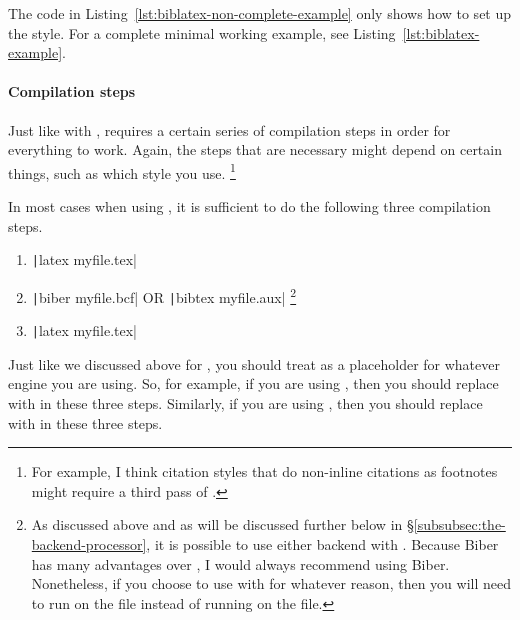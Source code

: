 The code in Listing~\ref{lst:biblatex-non-complete-example} only shows how to set up the style.
For a complete minimal working example, see Listing~\ref{lst:biblatex-example}.

\paragraph{Compilation steps}

Just like with ,  requires a certain series of compilation steps in order for everything to work.
Again, the steps that are necessary might depend on certain things, such as which style you use.%
\footnote{%
For example, I think citation styles that do non-inline citations as footnotes might require a third pass of .%
}

In most cases when using , it is sufficient to do the following three compilation steps.

\begin{enumerate}[label={(\roman*)}]

	\item{\texttt|latex myfile.tex|}
	
	\item{\texttt|biber myfile.bcf| OR \texttt|bibtex myfile.aux|%
	\footnote{%
	\label{fn:backends-with-biblatex}
	As discussed above and as will be discussed further below in \S\ref{subsubsec:the-backend-processor}, it is possible to use either backend with .
	Because Biber has many advantages over , I would always recommend using Biber.
	Nonetheless, if you choose to use  with  for whatever reason, then you will need to run  on the  file instead of running  on the  file.%
	}
	}
	
	\item{\texttt|latex myfile.tex|}

\end{enumerate}

Just like we discussed above for , you should treat  as a placeholder for whatever engine you are using.
So, for example, if you are using , then you should replace  with  in these three steps.
Similarly, if you are using , then you should replace  with  in these three steps.

